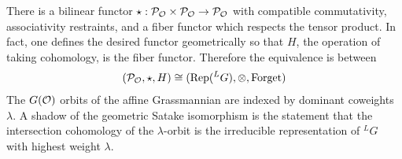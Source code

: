There is a bilinear functor $\star:{\mathcal{P}}_{{\mathcal{O}}}\times {\mathcal{P}}_{{\mathcal{O}}} \to {\mathcal{P}}_{{\mathcal{O}}}$ with compatible
commutativity, associativity restraints, and a fiber functor which respects the tensor product.
In fact, one defines the desired functor geometrically so that $H$, the operation
of taking cohomology, is the fiber functor. Therefore 
the equivalence is between \begin{align*}
    ({\mathcal{P}}_{{\mathcal{O}}},\star,H) \cong (\operatorname{Rep}(^L G), \otimes, \text{Forget})
\end{align*}
The $G({\mathcal{O}})$ orbits of the affine Grassmannian are indexed by dominant coweights $\lambda$.
A shadow of the geometric Satake isomorphism is the statement that the 
intersection cohomology of the $\lambda$-orbit is the irreducible representation of $^L G$
with highest weight $\lambda$.
